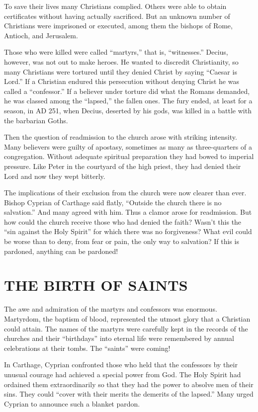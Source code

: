 To save their lives many Christians complied. Others were able to obtain certificates without having
actually sacrificed. But an unknown number of Christians were imprisoned or executed, among them the
bishops of Rome, Antioch, and Jerusalem.

Those who were killed were called “martyrs,” that is, “witnesses.” Decius, however, was not out to
make heroes. He wanted to discredit Christianity, so many Christians were tortured until they denied
Christ by saying “Caesar is Lord.” If a Christian endured this persecution without denying Christ he
was called a “confessor.” If a believer under torture did what the Romans demanded, he was classed
among the “lapsed,” the fallen ones. The fury ended, at least for a season, in AD 251, when Decius,
deserted by his gods, was killed in a battle with the barbarian Goths.

Then the question of readmission to the church arose with striking intensity. Many believers were
guilty of apostasy, sometimes as many as three-quarters of a congregation. Without adequate
spiritual preparation they had bowed to imperial pressure. Like Peter in the courtyard of the high
priest, they had denied their Lord and now they wept bitterly.

The implications of their exclusion from the church were now clearer than ever. Bishop Cyprian of
Carthage said flatly, “Outside the church there is no salvation.” And many agreed with him. Thus a
clamor arose for readmission. But how could the church receive those who had denied the faith?
Wasn’t this the “sin against the Holy Spirit” for which there was no forgiveness? What evil could be
worse than to deny, from fear or pain, the only way to salvation? If this is pardoned, anything can
be pardoned!

\section{THE BIRTH OF SAINTS}

The awe and admiration of the martyrs and confessors was enormous. Martyrdom, the baptism of blood,
represented the utmost glory that a Christian could attain. The names of the martyrs were carefully
kept in the records of the churches and their “birthdays” into eternal life were remembered by
annual celebrations at their tombs. The “saints” were coming!

In Carthage, Cyprian confronted those who held that the confessors by their unusual courage had
achieved a special power from God. The Holy Spirit had ordained them extraordinarily so that they
had the power to absolve men of their sins. They could “cover with their merits the demerits of the
lapsed.” Many urged Cyprian to announce such a blanket pardon.

